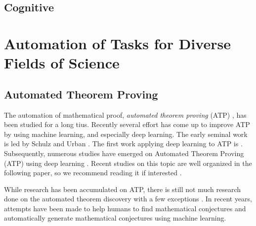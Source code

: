 \subsection{Cognitive }

\section{Automation of Tasks for Diverse Fields of Science}

\subsection{Automated Theorem Proving}

The automation of mathematical proof, \textit{automated theorem proving} (ATP) , has been studied for a long tius. Recently several effort has come up to improve ATP by using machine learning, and especially deep learning. The 
 early seminal work is led by Schulz \cite{schulz2001learning} and Urban \cite{urban2004mptp,urban2008malarea}. The first work applying deep learning to ATP is \cite{irving2016deepmath}. Subsequently, numerous studies have emerged on Automated Theorem Proving (ATP) using deep learning \cite{bansal2019holist}. Recent studies on this topic are well organized in the following paper, so we recommend reading it if interested \cite{rabe2021towards}.

 While research has been accumulated on ATP, there is still not much research done on the automated theorem discovery with a few exceptions \cite{gao2014systematic}. In recent years, attempts have been made to help humans to find mathematical conjectures \cite{davies2021advancing} and
 automatically generate mathematical conjectures \cite{raayoni2021generating}  using machine learning.



